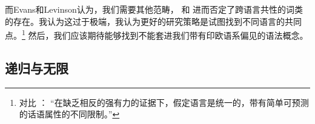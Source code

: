 而Evans和Levinson认为，我们需要其他范畴， \citet[]{Haspelmath2009a}和 \citet[]{Croft2009a}进而否定了跨语言共性的词类的存在。我认为这过于极端，我认为更好的研究策略是试图找到不同语言的共同点。\footnote{%
对比 ：
“在缺乏相反的强有力的证据下，假定语言是统一的，带有简单可预测的话语属性的不同限制。”
} 
然后，我们应该期待能够找到不能套进我们带有印欧语系偏见的语法概念。

\subsection{递归与无限}
\label{Abschnitt-Rekursion}

